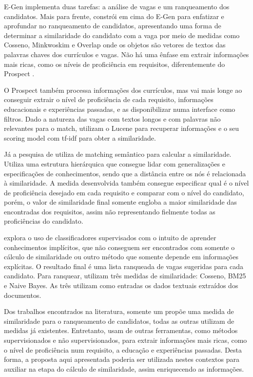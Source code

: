 \documentclass[preprint,12pt]{elsarticle}
\begin{document}
E-Gen implementa duas tarefas: a análise de vagas e um ranqueamento dos candidatos. Mais para frente, \cite{improve-ranking-candidates-2009} constrói em cima do E-Gen \cite{e-gen-job-processing-2007} para enfatizar e aprofundar no ranqueamento de candidatos, apresentando uma forma de determinar a similaridade do candidato com a vaga por meio de medidas como Cosseno, Minkwoskim e Overlap onde os objetos são vetores de textos das palavras chaves dos currículos e vagas. Não há uma ênfase em extrair informações mais ricas, como os níveis de proficiência em requisitos, diferentemente do Prospect \cite{Singh2010PROSPECTAS}.

O Prospect \cite{Singh2010PROSPECTAS} também processa informações dos currículos, mas vai mais longe ao conseguir extrair o nível de proficiência de cada requisito, informações educacionais e experiências passadas, e as disponibilizar numa interface como filtros. Dado a natureza das vagas com textos longos e com palavras não relevantes para o match, utilizam o Lucene para recuperar informações e o seu scoring model com tf-idf para obter a similaridade.

Já a pesquisa de \cite{impact-semantic-web-2005} utiliza de matching semântico para calcular a similaridade. Utiliza uma estrutura hierárquica que consegue lidar com generalizações e especificações de conhecimentos, sendo que a distância entre os nós é relacionada à similaridade. A medida desenvolvida também consegue especificar qual é o nível de proficiência desejado em cada requisito e comparar com o nível do candidato, porém, o valor de similaridade final somente engloba a maior similaridade das encontradas dos requisitos, assim não representando fielmente todas as proficiências do candidato. 

\cite{poch-etal-2014-ranking} explora o uso de classificadores supervisados com o intuito de aprender conhecimentos implícitos, que não conseguem ser encontrados com somente o cálculo de similaridade ou outro método que somente depende em informações explícitas. O resultado final é uma lista ranqueada de vagas sugeridas para cada candidato. Para ranquear, utilizam três medidas de similaridade: Cosseno, BM25 e Naive Bayes. As três utilizam como entradas os dados textuais extraídos dos documentos.

Dos trabalhos encontrados na literatura, somente um \cite{impact-semantic-web-2005} propõe uma medida de similaridade para o ranqueamento de candidatos, todas as outras utilizam de medidas já existentes. Entretanto, usam de outras ferramentas, como métodos supervisionados e não supervisionados, para extrair informações mais ricas, como o nível de proficiência num requisito, a educação e experiências passadas. Desta forma, a proposta aqui apresentada poderia ser utilizada nestes contextos para auxiliar na etapa do cálculo de similaridade, assim enriquecendo as informações.
\end{document}
